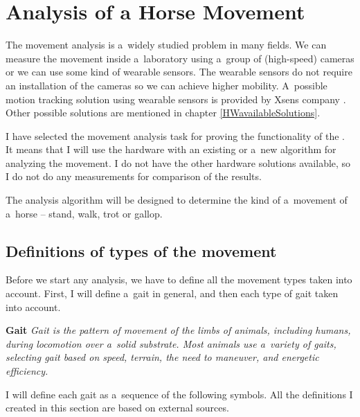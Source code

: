 \chapter{Analysis of a Horse Movement}
\label{HorseAnalysis}
The movement analysis is a~widely studied problem in many fields. We can measure the movement inside a~laboratory using a~group of (high-speed) cameras or we can use some kind of wearable sensors. The wearable sensors do not require an installation of the cameras so we can achieve higher mobility. A~possible motion tracking solution using wearable sensors is provided by Xsens company \cite{Xsens:MVN}. Other possible solutions are mentioned in chapter \ref{HWavailableSolutions}.

I have selected the movement analysis task for proving the functionality of the . It means that I will use the  hardware with an existing or a~new algorithm for analyzing the movement. I do not have the other hardware solutions available, so I do not do any measurements for comparison of the results.

The analysis algorithm will be designed to determine the kind of a~movement of a~horse -- stand, walk, trot or gallop.

\section{Definitions of types of the movement}
\label{definitionsOfGaits}
Before we start any analysis, we have to define all the movement types taken into account. First, I will define a~gait in general, and then each type of gait taken into account.

\begin{definition}{\textbf{Gait}}
    \label{def:gait}
    \textit{Gait is the pattern of movement of the limbs of animals, including humans, during locomotion over a~solid substrate. Most animals use a~variety of gaits, selecting gait based on speed, terrain, the need to maneuver, and energetic efficiency.} \cite{Higgins2009}
\end{definition}

I will define each gait as a~sequence of the following symbols. All the definitions I created in this section are based on external sources. \cite{Higgins2009} \cite{Duruttya2005} \cite{Harrisc1993}

